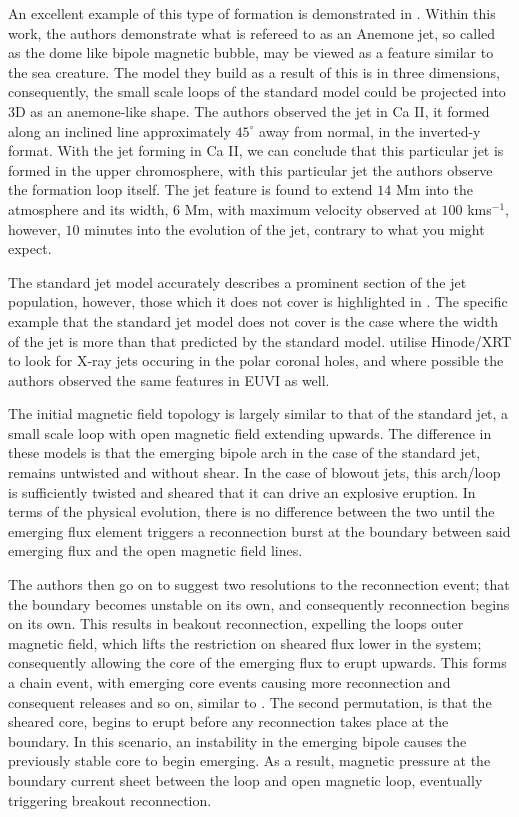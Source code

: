 An excellent example of this type of formation is demonstrated in \cite{Nishizuka2011}.
Within this work, the authors demonstrate what is refereed to as an Anemone jet, so called as the dome like bipole magnetic bubble, may be viewed as a feature similar to the sea creature.
The model they build as a result of this is in three dimensions, consequently, the small scale loops of the standard model could be projected into $3$D as an anemone-like shape.
The authors observed the jet in Ca II, it formed along an inclined line approximately $45^\circ$ away from normal, in the inverted-y format.
With the jet forming in Ca II, we can conclude that this particular jet is formed in the upper chromosphere, with this particular jet the authors observe the formation loop itself.
The jet feature is found to extend $14$ Mm into the atmosphere and its width, $6$ Mm, with maximum velocity observed at $100$ kms$^{-1}$, however, $10$ minutes into the evolution of the jet, contrary to what you might expect.

The standard jet model accurately describes a prominent section of the jet population, however, those which it does not cover is highlighted in \cite{Moore2010}.
The specific example that the standard jet model does not cover is the case where the width of the jet is more than that predicted by the standard model.
\cite{Moore2010} utilise Hinode/XRT to look for X-ray jets occuring in the polar coronal holes, and where possible the authors observed the same features in EUVI as well.

The initial magnetic field topology is largely similar to that of the standard jet, a small scale loop with open magnetic field extending upwards.
The difference in these models is that the emerging bipole arch in the case of the standard jet, remains untwisted and without shear.
In the case of blowout jets, this arch/loop is sufficiently twisted and sheared that it can drive an explosive eruption.
In terms of the physical evolution, there is no difference between the two until the emerging flux element triggers a reconnection burst at the boundary between said emerging flux and the open magnetic field lines.

The authors then go on to suggest two resolutions to the reconnection event; that the boundary becomes unstable on its own, and consequently reconnection begins on its own.
This results in beakout reconnection, expelling the loops outer magnetic field, which lifts the restriction on sheared flux lower in the system; consequently allowing the core of the emerging flux to erupt upwards. 
This forms a chain event, with emerging core events causing more reconnection and consequent releases and so on, similar to \cite{Antiochos1998}.
The second permutation, is that the sheared core, begins to erupt before any reconnection takes place at the boundary.
In this scenario, an instability in the emerging bipole causes the previously stable core to begin emerging.
As a result, magnetic pressure at the boundary current sheet between the loop and open magnetic loop, eventually triggering breakout reconnection.

